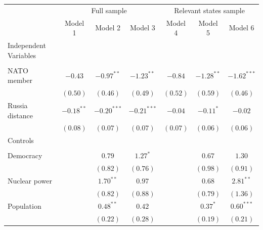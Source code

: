 \documentclass[
]{article}
\begin{document}
\begin{table}[h!]
\begin{center}
\begin{tabular}{l c c c c c c}
\hline
 & \multicolumn{3}{c}{Full sample} & \multicolumn{3}{c}{Relevant states sample} \\
\cline{2-4} \cline{5-7}
 & Model 1 & Model 2 & Model 3 & Model 4 & Model 5 & Model 6 \\
\hline
Independent Variables &              &               &               &          &              &               \\
                      &              &               &               &          &              &               \\
\quad NATO member     & $-0.43$      & $-0.97^{**}$  & $-1.23^{**}$  & $-0.84$  & $-1.28^{**}$ & $-1.62^{***}$ \\
                      & $(0.50)$     & $(0.46)$      & $(0.49)$      & $(0.52)$ & $(0.59)$     & $(0.46)$      \\
\quad Russia distance & $-0.18^{**}$ & $-0.20^{***}$ & $-0.21^{***}$ & $-0.04$  & $-0.11^{*}$  & $-0.02$       \\
                      & $(0.08)$     & $(0.07)$      & $(0.07)$      & $(0.07)$ & $(0.06)$     & $(0.06)$      \\
Controls              &              &               &               &          &              &               \\
                      &              &               &               &          &              &               \\
\quad Democracy       &              & $0.79$        & $1.27^{*}$    &          & $0.67$       & $1.30$        \\
                      &              & $(0.82)$      & $(0.76)$      &          & $(0.98)$     & $(0.91)$      \\
\quad Nuclear power   &              & $1.70^{**}$   & $0.97$        &          & $0.68$       & $2.81^{**}$   \\
                      &              & $(0.82)$      & $(0.88)$      &          & $(0.79)$     & $(1.36)$      \\
\quad Population      &              & $0.48^{**}$   & $0.42$        &          & $0.37^{*}$   & $0.60^{***}$  \\
                      &              & $(0.22)$      & $(0.28)$      &          & $(0.19)$     & $(0.21)$      \\

\end{tabular}
\end{center}
\end{table}
\end{document}
